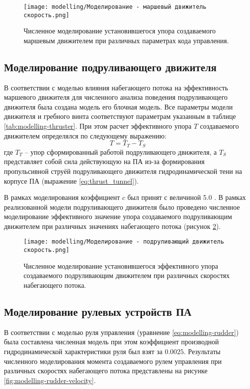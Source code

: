 \begin{figure}[ht]
    \centering
    \texttt{[image: modelling/Моделирование - маршевый движитель скорость.png]}
    \caption{Численное моделирование установившегося  упора создаваемого маршевым движителем при различных параметрах кода управления.}
    \label{fig:modelling-thruster-code}
\end{figure}

\subsection{Моделирование подруливающего движителя}

В соответствии с моделью влияния набегающего потока на эффективность маршевого движителя для численного анализа поведения подруливающего движителя была создана модель его блочная модель.
Все параметры модели движителя и гребного винта соответствуют параметрам указанным в таблице \ref{tab:modelling-thruster}.
При этом расчет эффективного упора $T$ создаваемого движителем определялся по следующему выражению:
\begin{equation*}
    T = T_T - T_S
\end{equation*}
\noindent где $T_T$ -- упор сформированный работой подруливающего движителя, а $T_S$ представляет собой сила действующую на ПА из-за формирования пропульсивной струёй подруливающего движителя гидродинамической тени на корпусе ПА (выражение \ref{eq:thrust_tunnel}).

В рамках моделирования коэффициент $c$ был принят с величиной 5.0 \cite{palmer2009experimental}.
В рамках реализованной модели подруливающего движителя было проведено численное моделирование эффективного значение упора создаваемого подруливающим движителем при различных значениях набегающего потока (рисунок \ref{fig:modelling-tunnel-velocity}).

\begin{figure}[ht]
    \centering
    \texttt{[image: modelling/Моделирование - подруливающий движитель скорость.png]}
    \caption{Численное моделирование установившегося эффективного упора создаваемого подруливающим движителем при различных скоростях набегающего потока.}
    \label{fig:modelling-tunnel-velocity}
\end{figure}

\subsection{Моделирование рулевых устройств ПА}
В соответствии с моделью руля управления (уравнение \ref{eq:modelling-rudder}) была составлена численная модель при этом коэффициент производной гидродинамической характеристики руля был взят за $0.0025$.
Результаты численного моделирования момента создаваемого рулем управления при различных скоростях набегающего потока представлены на рисунке \ref{fig:modelling-rudder-velocity}.

